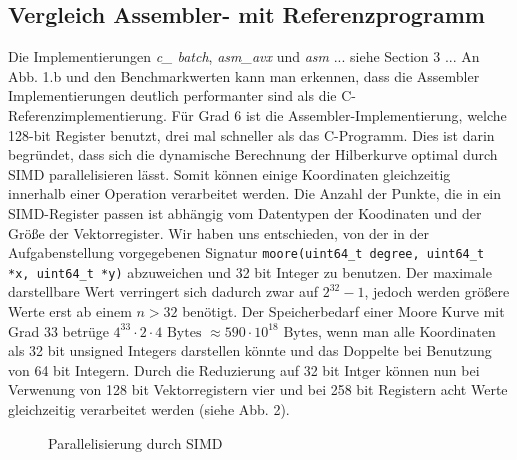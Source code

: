 \documentclass[course=erap]{aspdoc}
\begin{document}
\subsection{Vergleich Assembler- mit Referenzprogramm}
Die Implementierungen \textit{c\_ batch}, \textit{asm\_avx} und \textit{asm} ... siehe Section 3 ... \newline
An Abb. 1.b und den Benchmarkwerten kann man erkennen, dass die Assembler Implementierungen deutlich performanter sind als die C-Referenzimplementierung. Für Grad 6 ist die Assembler-Implementierung, welche 128-bit Register benutzt, drei mal schneller als das C-Programm. Dies ist darin begründet, dass sich die dynamische Berechnung der Hilberkurve optimal durch SIMD parallelisieren lässt. Somit können einige Koordinaten gleichzeitig innerhalb einer Operation verarbeitet werden. Die Anzahl der Punkte, die in ein SIMD-Register passen ist abhängig vom Datentypen der Koodinaten und der Größe der Vektorregister. Wir haben uns entschieden, von der in der Aufgabenstellung vorgegebenen Signatur \texttt{moore(uint64\_t degree, uint64\_t *x, uint64\_t *y)} abzuweichen und 32 bit Integer zu benutzen. Der maximale darstellbare Wert verringert sich dadurch zwar auf $2^{32}-1$, jedoch werden größere Werte erst ab einem $n > 32$ benötigt. Der Speicherbedarf einer Moore Kurve mit Grad 33 betrüge $4^{33} \cdot 2 \cdot 4 \text{ Bytes } \approx 590 \cdot 10^{18} \text{ Bytes}$, wenn man alle Koordinaten als 32 bit unsigned Integers darstellen könnte und das Doppelte bei Benutzung von 64 bit Integern. 
\newline
Durch die Reduzierung auf 32 bit Intger können nun bei Verwenung von 128 bit Vektorregistern vier und bei 258 bit Registern acht Werte gleichzeitig verarbeitet werden (siehe Abb. 2).

\begin{figure}[htbp] 
    \centering
    \caption{Parallelisierung durch SIMD}%
    \label{fig:SIMD}%
\end{figure}
\end{document}

